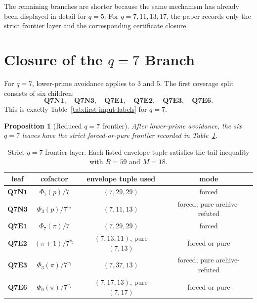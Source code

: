 \documentclass[11pt]{article}
\newtheorem{proposition}[theorem]{Proposition}
\theoremstyle{definition}
\theoremstyle{remark}
\begin{document}
\begingroup
\setlength{\abovedisplayskip}{6pt plus 2pt minus 2pt}
\setlength{\belowdisplayskip}{6pt plus 2pt minus 2pt}
\setlength{\abovedisplayshortskip}{3pt plus 1pt minus 1pt}
\setlength{\belowdisplayshortskip}{4pt plus 1pt minus 1pt}

\endgroup

The remaining branches are shorter because the same mechanism has already been
displayed in detail for \(q=5\).  For \(q=7,11,13,17\), the paper records only
the strict frontier layer and the corresponding certificate closure.

\section{Closure of the \(q=7\) Branch}
\label{sec:q7}

For \(q=7\), lower-prime avoidance applies to \(3\) and \(5\).  The first
coverage split consists of six children:
\[
  \mathbf{Q7N1},\quad \mathbf{Q7N3},\quad
  \mathbf{Q7E1},\quad \mathbf{Q7E2},\quad
  \mathbf{Q7E3},\quad \mathbf{Q7E6}.
\]
This is exactly Table~\ref{tab:first-input-labels} for \(q=7\).

\begin{proposition}[Reduced \(q=7\) frontier]
\label{prop:q7-frontier}
After lower-prime avoidance, the six \(q=7\) leaves have the strict
forced-or-pure frontier recorded in Table~\ref{tab:q7-frontier}.
\end{proposition}

\begin{table}[ht]
\centering
\small
\begin{tabular}{c|c|c|c}
\toprule
leaf & cofactor & envelope tuple used & mode\\
\midrule
\(\mathbf{Q7N1}\) & \(\Phi_7(p)/7\) & \((7,29,29)\) & forced\\
\(\mathbf{Q7N3}\) & \(\Phi_3(p)/7^{v_7}\) & \((7,11,13)\) & forced; pure archive-refuted\\
\(\mathbf{Q7E1}\) & \(\Phi_7(\pi)/7\) & \((7,29,29)\) & forced\\
\(\mathbf{Q7E2}\) & \((\pi+1)/7^{v_7}\) & \((7,13,11)\), pure \((7,13)\) & forced or pure\\
\(\mathbf{Q7E3}\) & \(\Phi_3(\pi)/7^{v_7}\) & \((7,37,13)\) & forced; pure archive-refuted\\
\(\mathbf{Q7E6}\) & \(\Phi_6(\pi)/7^{v_7}\) & \((7,17,13)\), pure \((7,17)\) & forced or pure\\
\bottomrule
\end{tabular}
\caption{Strict \(q=7\) frontier layer.  Each listed envelope tuple satisfies the
tail inequality with \(B=59\) and \(M=18\).}
\label{tab:q7-frontier}
\end{table}
\FloatBarrier
\end{document}
